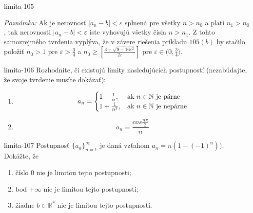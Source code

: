 \begin{defproblem}{limita-105}
\begin{solution}
    \textit{Poznámka:}
    Ak je nerovnosť $|a_n - b| < \varepsilon$ splnená pre všetky $n > n_0$ a
    platí $n_1 > n_0$, tak nerovnosti $|a_n-b|<\varepsilon$ iste vyhovujú všetky
    čísla $n > n_1$. Z tohto samozrejmého tvrdenia vyplýva, že v závere riešenia
    príkladu $105 (b)$ by stačilo položiť $n_0 > 1$ pre $\varepsilon >
    \frac{3}{4}$ a $n_0 \geq [\frac{3 + \sqrt{9 - 16\varepsilon^2}}{2
    \varepsilon}]$ pre $\varepsilon \in (0,\frac{3}{4}\rangle$.
 \end{solution}
\end{defproblem}

\begin{defproblem}{limita-106}
Rozhodnite, či existujú limity nasledujúcich postupností (nezabúdajte, že svoje
tvrdenie musíte dokázať):
\begin{enumerate}
\item
    \[
    a_n =
        \begin{cases}
            1-\frac{1}{n}, & $ak $ n \in \mathbb{N}\ $je párne$ \\
            1+\frac{1}{n^2}, & $ak $ n\in \mathbb{N}\ $je nepárne$
        \end{cases}
    \]
\item \[a_n=\frac{cos \frac{n \pi}{2}}{n}\]
\end{enumerate}
\end{defproblem}

\begin{defproblem}{limita-107}
Postupnosť ${\{a_n\}}_{n=1}^\infty$ je daná vzťahom $a_n=n(1-(-1)^n)).$ Dokážte, že
\begin{enumerate}
\item číslo $0$ nie je limitou tejto postupnosti;
\item bod $+\infty$ nie je limitou tejto postupnosti;
\item žiadne $b \in \mathbb{R^*}$ nie je limitou tejto postupnosti.
\end{enumerate}
\end{defproblem}

